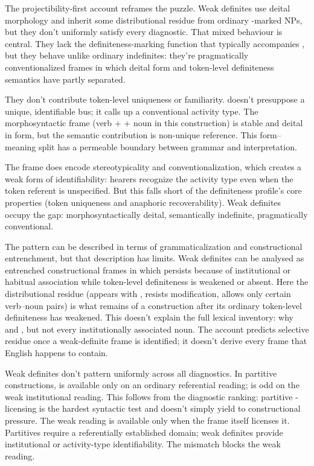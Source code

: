 \documentclass[12pt,letterpaper]{article}
\begin{document}
The projectibility-first account reframes the puzzle. Weak definites use deital morphology and inherit some distributional residue from ordinary -marked NPs, but they don't uniformly satisfy every diagnostic. That mixed behaviour is central. They lack the definiteness-marking function that typically accompanies , but they behave unlike ordinary indefinites: they're pragmatically conventionalized frames in which deital form and token-level definiteness semantics have partly separated.

They don't contribute token-level uniqueness or familiarity.  doesn't presuppose a unique, identifiable bus; it calls up a conventional activity type. The morphosyntactic frame (verb +  + noun in this construction) is stable and deital in form, but the semantic contribution is non-unique reference. This form--meaning split has a permeable boundary between grammar and interpretation.

The frame does encode stereotypicality and conventionalization, which creates a weak form of identifiability: hearers recognize the activity type even when the token referent is unspecified. But this falls short of the definiteness profile's core properties (token uniqueness and anaphoric recoverability). Weak definites occupy the gap: morphosyntactically deital, semantically indefinite, pragmatically conventional.

The pattern can be described in terms of grammaticalization and constructional entrenchment, but that description has limits. Weak definites can be analysed as entrenched constructional frames in which  persists because of institutional or habitual association while token-level definiteness is weakened or absent. Here the distributional residue (appears with , resists modification, allows only certain verb--noun pairs) is what remains of a construction after its ordinary token-level definiteness has weakened. This doesn't explain the full lexical inventory: why  and , but not every institutionally associated noun. The account predicts selective residue once a weak-definite frame is identified; it doesn't derive every frame that English happens to contain.

Weak definites don't pattern uniformly across all diagnostics. In partitive constructions,  is available only on an ordinary referential reading;  is odd on the weak institutional reading. This follows from the diagnostic ranking: partitive -licensing is the hardest syntactic test and doesn't simply yield to constructional pressure. The weak reading is available only when the frame itself licenses it. Partitives require a referentially established domain; weak definites provide institutional or activity-type identifiability. The mismatch blocks the weak reading.
\end{document}
